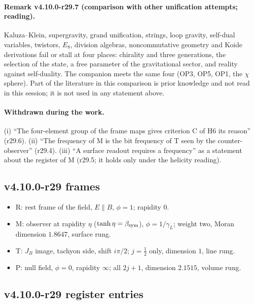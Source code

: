 \paragraph{Remark v4.10.0-r29.7 (comparison with other unification attempts; reading).}
Kaluza--Klein, supergravity, grand unification, strings, loop gravity, self-dual variables, twistors, \(E_8\), division algebras, noncommutative
geometry and Koide derivations fail or stall at four places: chirality and three generations, the selection of the state, a free parameter of the
gravitational sector, and reality against self-duality.  The companion meets the same four (OP3, OP5, OP1, the \(\chi\) sphere).  Part of the
literature in this comparison is prior knowledge and not read in this session; it is not used in any statement above.

\paragraph{Withdrawn during the work.}
(i) ``The four-element group of the frame maps gives criterion C of H6 its reason'' (r29.6).  (ii) ``The frequency of M is the bit frequency of T seen
by the counter-observer'' (r29.4).  (iii) ``A surface readout requires a frequency'' as a statement about the register of M (r29.5; it holds only
under the helicity reading).

\subsection*{v4.10.0-r29 frames}
\label{subsec:v4100-r29-frames}

\begin{itemize}[leftmargin=2em]
\item R: rest frame of the field, \(E\parallel B\), \(\phi=1\); rapidity \(0\).
\item M: observer at rapidity \(\eta\) (\(\tanh\eta=\beta_{\rm sym}\)), \(\phi=1/\gamma_L\); weight two, Moran dimension \(1.8647\), surface rung.
\item T: \(J_B\) image, tachyon side, shift \(i\pi/2\); \(j=\tfrac12\) only, dimension \(1\), line rung.
\item P: null field, \(\phi=0\), rapidity \(\infty\); all \(2j+1\), dimension \(2.1515\), volume rung.
\end{itemize}

\subsection*{v4.10.0-r29 register entries}
\label{subsec:v4100-r29-register}

